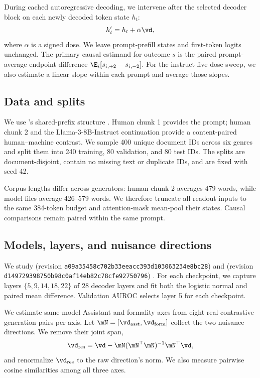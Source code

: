 During cached autoregressive decoding, we intervene after the selected decoder block on each newly decoded token state $h_t$:
\begin{equation}
h'_t=h_t+\alpha\vd,
\label{eq:intervention}
\end{equation}
where $\alpha$ is a signed dose. We leave prompt-prefill states and first-token logits unchanged. The primary causal estimand for outcome $s$ is the paired prompt-average endpoint difference $\E_i[s_{i,+2}-s_{i,-2}]$. For the instruct five-dose sweep, we also estimate a linear slope within each prompt and average those slopes.

\subsection{Data and splits}

We use \hape's shared-prefix structure \cite{reinhart2025llms}. Human chunk 1 provides the prompt; human chunk 2 and the Llama-3-8B-Instruct continuation provide a content-paired human--machine contrast. We sample 400 unique document IDs across six genres and split them into 240 training, 80 validation, and 80 test IDs. The splits are document-disjoint, contain no missing text or duplicate IDs, and are fixed with seed 42.

Corpus lengths differ across generators: human chunk 2 averages 479 words, while model files average 426--579 words. We therefore truncate all readout inputs to the same 384-token budget and attention-mask mean-pool their states. Causal comparisons remain paired within the same prompt.

\subsection{Models, layers, and nuisance directions}

We study \qweninst (revision \texttt{a09a35458c702b33eeacc393d103063234e8bc28}) and \qwenbase (revision \texttt{d149729398750b98c0af14eb82c78cfe92750796}) \cite{qwen2024qwen25}. For each checkpoint, we capture layers $\{5,9,14,18,22\}$ of 28 decoder layers and fit both the logistic normal and paired mean difference. Validation AUROC selects layer 5 for each checkpoint.

We estimate same-model Assistant and formality axes from eight real contrastive generation pairs per axis. Let $\mN=[\vd_{\mathrm{asst}},\vd_{\mathrm{form}}]$ collect the two nuisance directions. We remove their joint span,
\begin{equation}
\vd_{\mathrm{res}}=\vd-\mN(\mN^\top\mN)^{-1}\mN^\top\vd,
\end{equation}
and renormalize $\vd_{\mathrm{res}}$ to the raw direction's norm. We also measure pairwise cosine similarities among all three axes.

